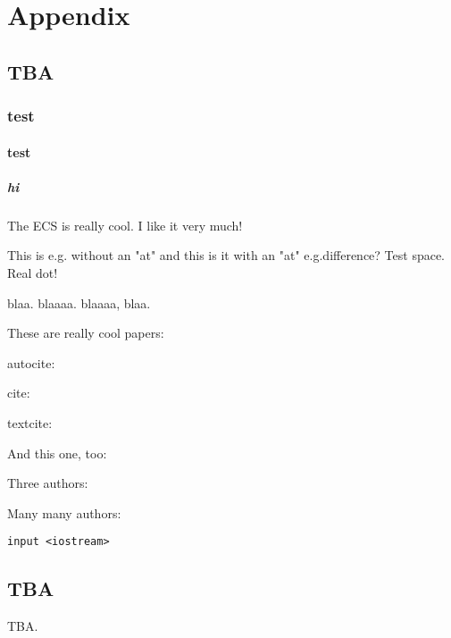 


\chapter{Appendix}

\renewcommand{\thesection}{\Alph{section}}


\section{TBA}


\subsection{test}


\subsubsection{test}


\paragraph{hi}

The \ac{ECS} is really cool. I like it very much!

This is e.g. without an "at" and this is it with an "at" e.g.\@ difference?
Test space. Real dot!

\Eg blaa. \Eg{} blaaaa. \ie blaaaa, \ie{} blaa.

These are really cool papers: \autocite{Schlund2020, Schlund2020a}

autocite:
\autocite{Lauer2018}

cite:
\cite{Lauer2010}
\autocite{Anav2015}
\autocite{Anav2013}
\autocite{Allen2002}

textcite:
\textcite{Lauer2010}

And this one, too: \autocite{Lauer2020}

Three authors: \autocite{Bao2020}

Many many authors: \autocite{Eyring2020}

\texttt{input <iostream>}


\section{TBA}

TBA.
